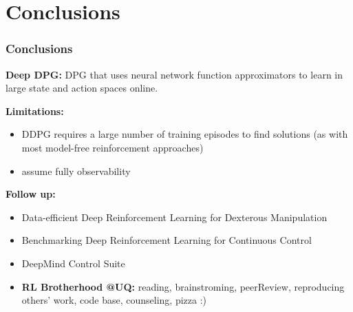 \section{Conclusions}

\begin{frame}
\frametitle{Conclusions}
\textbf{Deep DPG:} DPG that uses neural network function approximators to
learn in large state and action spaces online.
\vspace{3mm}

\textbf{Limitations:}
\begin{itemize}
  \item DDPG requires a large number of training episodes to find solutions
  (as with most model-free reinforcement approaches)
  \item assume fully observability
\end{itemize}
\vspace{3mm}

\textbf{Follow up:}
\begin{itemize}
\item {\footnotesize Data-efficient Deep Reinforcement Learning for Dexterous Manipulation}
\item Benchmarking Deep Reinforcement Learning for Continuous Control
\item DeepMind Control Suite
\item \textbf{RL Brotherhood @UQ:}
reading, brainstroming, peerReview,
reproducing others' work, code base, counseling, pizza :)
\end{itemize}

\end{frame}

